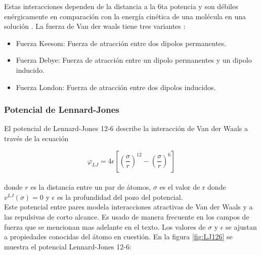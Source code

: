 Estas interacciones dependen de la distancia a la 6ta potencia y son débiles enérgicamente en comparación con la energía cinética de una molécula en una solución \cite{201753}. La fuerza de Van der waals tiene tres variantes \cite{ROY20151}: 

\begin{itemize}
    \item Fuerza Keesom: Fuerza de atracción entre dos dipolos permanentes.
    \item Fuerza Debye: Fuerza de atracción entre un dipolo permanentes y un dipolo inducido.
    \item Fuerza London: Fuerza de atracción entre dos dipolos inducidos.
\end{itemize}

\subsubsection{Potencial de Lennard-Jones}

El potencial de Lennard-Jones 12-6 describe la interacción de Van der Waals a través de la ecuación

\begin{equation} \label{LJ12-6}
    \varphi_{LJ} = 4\epsilon \left[ \left(\frac{\sigma}{r} \right)^{12}-\left(\frac{\sigma}{r} \right)^{6}\right]
\end{equation}\\

\noindent donde $r$ es la distancia entre un par de átomos, $\sigma$ es el valor de r donde $v^{LJ}(\sigma)=0$ y $\epsilon$ es la profundidad del pozo del potencial.\\

Este potencial entre pares modela interacciones atractivas de Van der Waals y a las repulsivas de corto alcance. Es usado de manera frecuente en los campos de fuerza que se mencionan mas adelante en el texto. Los valores de $\sigma$ y $\epsilon$ se ajustan a propiedades conocidas del átomo en cuestión. En la figura \ref{fig:LJ126} se muestra el potencial Lennard-Jones 12-6:\\

